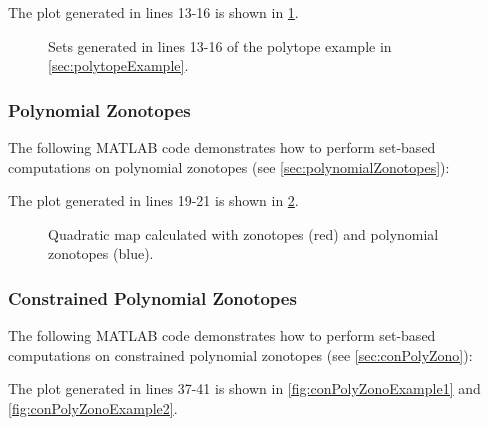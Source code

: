 The plot generated in lines 13-16 is shown in \cref{fig:polytopeExample}.

\begin{figure}[h!tb]
  \centering
  \caption{Sets generated in lines 13-16 of the polytope example in \cref{sec:polytopeExample}.}
  \label{fig:polytopeExample}
\end{figure}





\newpage
\subsubsection{Polynomial Zonotopes}	\label{sec:polyZonotopeExample}

The following MATLAB code demonstrates how to perform set-based computations on polynomial zonotopes (see \cref{sec:polynomialZonotopes}):

{\small
}

The plot generated in lines 19-21 is shown in \cref{fig:polyZonotopeExample}.

\begin{figure}[h!tb]
  \centering
  \caption{Quadratic map calculated with zonotopes (red) and polynomial zonotopes (blue).}
  \label{fig:polyZonotopeExample}
\end{figure}



\newpage
\subsubsection{Constrained Polynomial Zonotopes}	\label{sec:conPolyZonoExample}

The following MATLAB code demonstrates how to perform set-based computations on constrained polynomial zonotopes (see \cref{sec:conPolyZono}):

{\small
}

The plot generated in lines 37-41 is shown in \cref{fig:conPolyZonoExample1} and \cref{fig:conPolyZonoExample2}.


